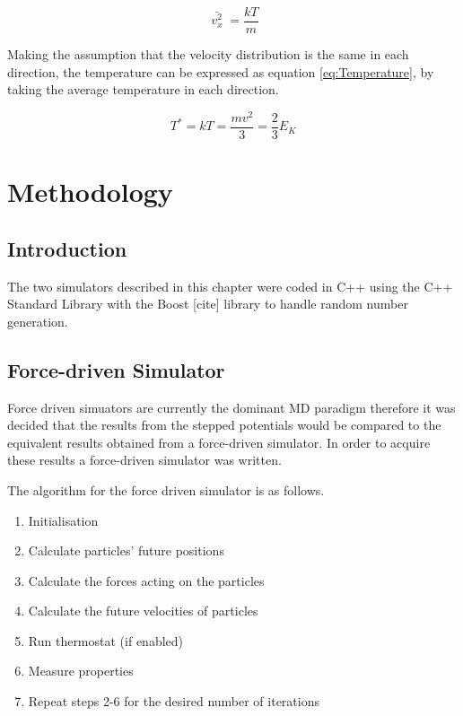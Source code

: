 \message{ !name(main.tex)}\documentclass[12pt]{UoAthesis}
\begin{document}
\begin{equation}
  \label{eq:MSV}
  \bar{\;v_x^2\;} = \frac{kT}{m}
\end{equation}

Making the assumption that the velocity distribution is the same in
each direction, the temperature can be expressed as equation
\eqref{eq:Temperature}, by taking the average temperature in each
direction. 

\begin{equation}
\label{eq:Temperature}
  T^* = kT = \frac{mv^2}{3} = \frac{2}{3}E_K
\end{equation}
\newpage

\chapter{Methodology} 
\section{Introduction} 

The two simulators described in this chapter were coded in C++ using
the C++ Standard Library with the Boost [cite] library to handle
random number generation.

\section{Force-driven Simulator} 
Force driven simuators are currently the
dominant MD paradigm therefore it was decided that the results from
the stepped potentials would be compared to the equivalent results
obtained from a force-driven simulator. In order to acquire these
results a force-driven simulator was written.

The algorithm for the force driven simulator is as follows. 
\begin{flushleft}
  \begin{enumerate} 
  \item Initialisation 
  \item Calculate particles' future positions 
  \item Calculate the forces acting on the particles 
  \item Calculate the future velocities of particles 
  \item Run thermostat (if enabled) 
  \item Measure properties 
  \item Repeat steps 2-6 for the desired number of iterations
  \end{enumerate} 
\end{flushleft}
\end{document}
